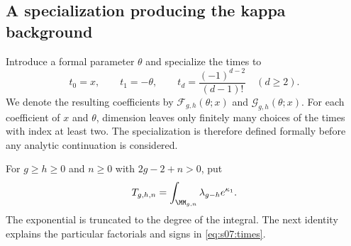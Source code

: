 \subsection{A specialization producing the kappa background}
\label{subsec:s07:02}

Introduce a formal parameter $\theta$ and specialize the times to
\begin{equation}\label{eq:s07:times}
 t_0=x,\qquad t_1=-\theta,\qquad
 t_d=\frac{(-1)^{d-2}}{(d-1)!}\quad(d\geq2).
\end{equation}
We denote the resulting coefficients by
$\mathcal F_{g,h}(\theta;x)$ and $\mathcal G_{g,h}(\theta;x)$.
For each coefficient of $x$ and $\theta$, dimension leaves only
finitely many choices of the times with index at least two.
The specialization is therefore defined formally before any analytic
continuation is considered.

For $g\geq h\geq0$ and $n\geq0$ with $2g-2+n>0$, put
\begin{equation}\label{eq:s07:kappa-integrals}
 T_{g,h,n}=\int_{\MM_{g,n}}\lambda_{g-h}e^{\kappa_1}.
\end{equation}
The exponential is truncated to the degree of the integral. The next
identity explains the particular factorials and signs in
\eqref{eq:s07:times}.

